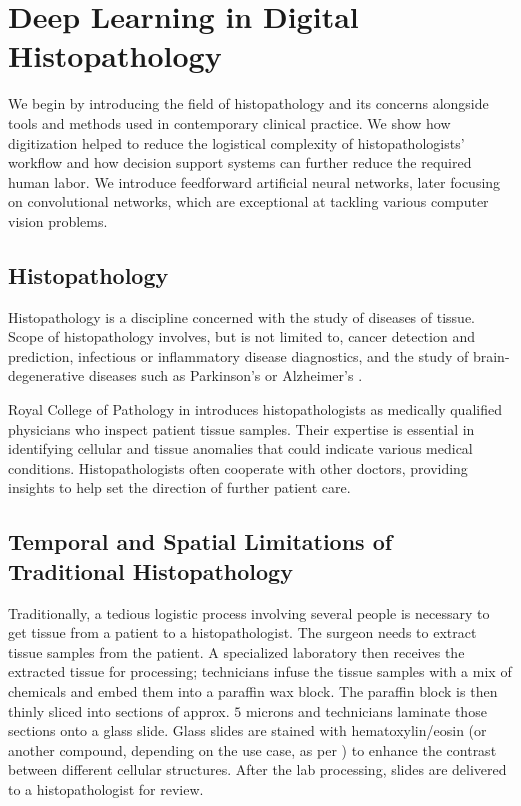 \chapter{Deep Learning in Digital Histopathology}

We begin by introducing the field of histopathology and its concerns alongside tools and methods used in contemporary clinical practice.
We show how digitization helped to reduce the logistical complexity of histopathologists' workflow and how decision support systems can further reduce the required human labor.
We introduce feedforward artificial neural networks, later focusing on convolutional networks, which are exceptional at tackling various computer vision problems.

\section{Histopathology}

Histopathology is a discipline concerned with the study of diseases of tissue.
Scope of histopathology involves, but is not limited to, cancer detection and prediction, infectious or inflammatory disease diagnostics, and the study of brain-degenerative diseases such as Parkinson's or Alzheimer's \cite{histopathology-cancer, histopathology-infectious, histopathology-inflammatory, histopathology-brain-degenerative}.

Royal College of Pathology in \cite{histopathologist-role} introduces histopathologists as medically qualified physicians who inspect patient tissue samples.
Their expertise is essential in identifying cellular and tissue anomalies that could indicate various medical conditions.
Histopathologists often cooperate with other doctors, providing insights to help set the direction of further patient care.

\section{Temporal and Spatial Limitations of Traditional Histopathology}

Traditionally, a tedious logistic process involving several people is necessary to get tissue from a patient to a histopathologist.
The surgeon needs to extract tissue samples from the patient.
A specialized laboratory then receives the extracted tissue for processing; technicians infuse the tissue samples with a mix of chemicals and embed them into a paraffin wax block.
The paraffin block is then thinly sliced into sections of approx. $5$ microns and technicians laminate those sections onto a glass slide.
Glass slides are stained with hematoxylin/eosin (or another compound, depending on the use case, as per \cite{histopathology-staining}) to enhance the contrast between different cellular structures.
After the lab processing, slides are delivered to a histopathologist for review.

